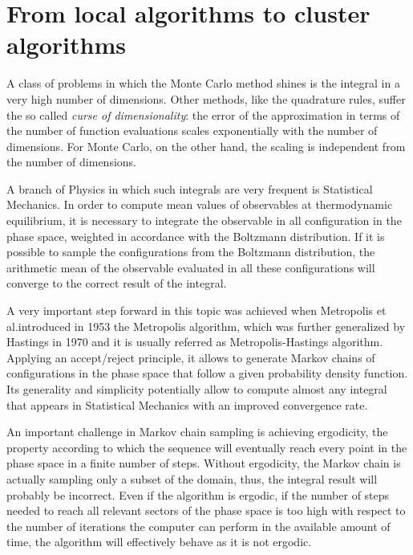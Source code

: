 \section*{From local algorithms to cluster algorithms}
A class of problems in which the Monte Carlo method shines is the integral in a very high number of dimensions.
Other methods, like the quadrature rules, suffer the so called \emph{curse of dimensionality}: the error of the approximation in terms of the number of function evaluations scales exponentially with the number of dimensions.
For Monte Carlo, on the other hand, the scaling is independent from the number of dimensions.

A branch of Physics in which such integrals are very frequent is Statistical Mechanics.
In order to compute mean values of observables at thermodynamic equilibrium,
it is necessary to integrate the observable in all configuration in the phase space, weighted in accordance with the Boltzmann distribution.
If it is possible to sample the configurations from the Boltzmann distribution,
the arithmetic mean of the observable evaluated in all these configurations will converge to the correct result of the integral.

A very important step forward in this topic was achieved when Metropolis et al.\@ introduced in 1953 \cite{metropolis:1953} the Metropolis algorithm,
which was further generalized by Hastings in 1970 \cite{hastings:1970} and it is usually referred as Metropolis-Hastings algorithm.
Applying an accept/reject principle, it allows to generate Markov chains of configurations in the phase space that follow a given probability density function.
Its generality and simplicity potentially allow to compute almost any integral that appears in Statistical Mechanics with an improved convergence rate.

An important challenge in Markov chain sampling is achieving ergodicity,
\ie the property according to which the sequence will eventually reach every point in the phase space in a finite number of steps.
Without ergodicity, the Markov chain is actually sampling only a subset of the domain, thus, the integral result will probably be incorrect.
Even if the algorithm is ergodic, if the number of steps needed to reach all relevant sectors of the phase space is too high
with respect to the number of iterations the computer can perform in the available amount of time, the algorithm will effectively behave as it is not ergodic.

